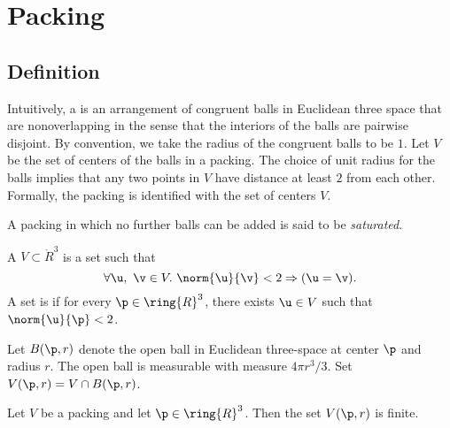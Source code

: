 
\chapter{Packing}


\section{Definition}



Intuitively, a  is an arrangement of congruent
balls in Euclidean three space that are nonoverlapping in the sense
that the interiors of the balls are pairwise disjoint.  By convention,
we take the radius of the congruent balls to be $1$.
Let $ V$ be the set of centers of the balls in a
packing. The choice of unit radius for the
balls implies that any two points in $ V$ have distance at
least $2$ from each other. 
 Formally, the packing is identified
with the set of centers $V$.
%

%
A packing in which no further balls can be added is said to be {\it
saturated}.

\begin{definition}
A  $ V\subset \ring{R}^3$ is a set such that
\begin{displaymath}\forall  \u,~\v\in  V.~  \norm{ \u}{\v} < 2 \Rightarrow ( \u=\v).\end{displaymath}
A set is  if for every $\p\in\ring{R}^3$, there
exists $ \u\in V$ such that $\norm{ \u}{\p}< 2$.
\end{definition}
%
%



Let $B(\p,r)$ denote the open ball in
Euclidean three-space at center $\p$ and radius $r$.  The open ball
is measurable with measure $4\pi r^3/3$.
 Set $ V(\p,r) = V \cap
B(\p,r)$. %
%
%

\begin{lemma}
\label{lemma:V-finite}
Let $ V$ be a packing and let $\p\in\ring{R}^3$.
Then the set $ V(\p,r)$ is finite.
\end{lemma}

